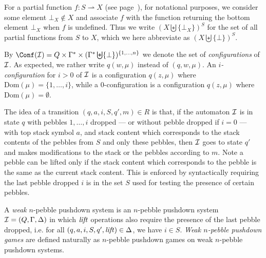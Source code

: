 For \fi a partial function $ f : S \rightharpoonup X $ (see page~\pageref{partial}), for notational purposes, we consider some element $\bot_X \not\in X$ and 
 associate $f$ with the function returning the 
bottom element $\bot_X$ when $f$ is undefined. Thus we write $(X \biguplus \{ \bot_X \})^S$ for the set of all partial functions from $S$ to $X$, which we here abbreviate as $(X \biguplus \{ \bot \})^S$. 


 
 
By $\Conf(\ppda)=Q\times \Gamma^* \times (\Gamma^* \biguplus \{ \bot \})^{\{1, \ldots, n\}}$ we denote the set of
{\em configurations} of $\mathcal{I}$. As expected, we rather write $q(w, \mu)$ instead of $(q, w, \mu)$.
An {\em$i$-configuration} for $i > 0$ of $\mathcal{I}$ is a configuration $q(z,\mu)$ where
$\text{Dom}(\mu) = \{1, \ldots, i\}$, while a $0$-configuration is a configuration 
 $q(z,\mu)$ where $\text{Dom}(\mu)=\emptyset$.



The idea of a transition $(q, a, i, S, q', m) \in R$
is that, if the automaton $\mathcal{I}$ is in state $q$ with pebbles $1,\ldots, i$ dropped \---- or without pebble dropped if $i = 0$ \---- with top stack symbol $a$, and stack content which corresponds to the stack contents of the pebbles from $S$ and only these pebbles, then
$\mathcal{I}$ goes to state 
$q'$ and makes modifications to the stack or the pebbles according to
$m$. 
Note a pebble 
can be lifted only if the stack content which corresponds to the pebble
is the same as the current stack content. 
This is enforced by syntactically requiring
the last pebble dropped $i$ is in the set $S$ used for testing the presence of certain pebbles.

\iffalse
A {\em weak} $n$-pebble pushdown system is an $n$-pebble pushdown system $\mathcal{I} = (Q, \Gamma,  \Delta )$ in which $\text{\textit{lift}}$ operations also require the presence of the last pebble dropped, i.e.
for all $(q, a, i, S, q', \text{\textit{lift}}) \in \Delta$, we have $ i \in S $. 
{\em Weak $n$-pebble pushdown games} are defined naturally as $n$-pebble pushdown games on 
weak $n$-pebble pushdown systems.

